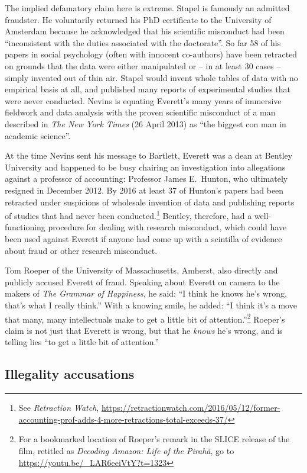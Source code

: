 \documentclass[output=paper,colorlinks,citecolor=brown
]{langscibook}
\begin{document}
The implied defamatory claim here is extreme. Stapel is famously an
admitted fraudster. He voluntarily returned his PhD certificate to
the University of Amsterdam because he acknowledged that his scientific
misconduct had been ``inconsistent with the duties associated with the
doctorate''. So far 58 of his papers in social psychology (often with
innocent co-authors) have been retracted on grounds that the data
were either manipulated or -- in at least 30 cases -- simply invented
out of thin air. Stapel would invent whole tables of data with no
empirical basis at all, and published many reports of experimental
studies that were never conducted. Nevins is equating Everett's many
years of immersive fieldwork and data analysis with the proven
scientific misconduct of a man described in \textit{The New York
Times} (26 April 2013) as ``the biggest con man in academic science''.

At the time Nevins sent his message to Bartlett, Everett was a dean
at Bentley University and happened to be busy chairing an investigation
into allegations against a professor of accounting: Professor James
E.\ Hunton, who ultimately resigned in December 2012. By 2016 at
least 37 of Hunton's papers had been retracted under suspicions of
wholesale invention of data and publishing reports of studies that
had never been conducted.\footnote{%
   See \textit{Retraction Watch},
   \url{https://retractionwatch.com/2016/05/12/former-accounting-prof-adds-4-more-retractions-total-exceeds-37/}}
Bentley, therefore, had a well-functioning procedure for dealing with
research misconduct, which could have been used against Everett if
anyone had come up with a scintilla of evidence about fraud or other
research misconduct.

Tom Roeper of the University of Massachusetts, Amherst, also directly
and publicly accused Everett of fraud. Speaking about Everett on camera
to the makers of \textit{The Grammar of Happiness}, he said: ``I think he
knows he's wrong, that's what I really think.'' With a knowing smile, he
added: ``I think it's a move that many, many intellectuals make to get a
little bit of attention.''\footnote{%
   For a bookmarked location of Roeper's remark in the SLICE release
   of the film, retitled as \textit{Decoding Amazon: Life of the Pirahã},
   go to \url{https://youtu.be/_LAR6eeiVtY?t=1323}}
Roeper's claim is not just that Everett is wrong, but that he
\emph{knows} he's wrong, and is telling lies ``to get a little bit
of attention.''

\subsection{Illegality accusations}
\end{document}

